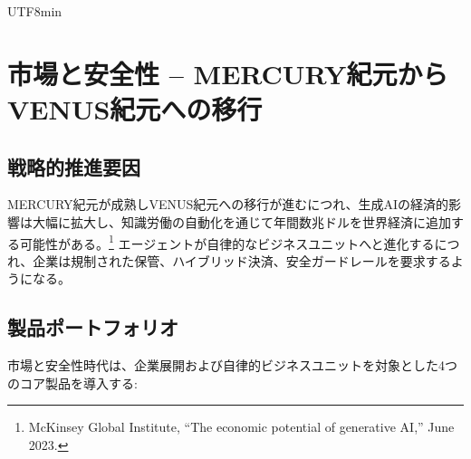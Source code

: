 \documentclass[11pt]{article}
\begin{document}
\begin{CJK}{UTF8}{min}
\section{市場と安全性 -- MERCURY紀元からVENUS紀元への移行}
\subsection{戦略的推進要因}
MERCURY紀元が成熟しVENUS紀元への移行が進むにつれ、生成AIの経済的影響は大幅に拡大し、知識労働の自動化を通じて年間数兆ドルを世界経済に追加する可能性がある。\footnote{McKinsey Global Institute, ``The economic potential of generative AI,'' June 2023.} エージェントが自律的なビジネスユニットへと進化するにつれ、企業は規制された保管、ハイブリッド決済、安全ガードレールを要求するようになる。

\subsection{製品ポートフォリオ}
市場と安全性時代は、企業展開および自律的ビジネスユニットを対象とした4つのコア製品を導入する:


\end{CJK}
\end{document}
